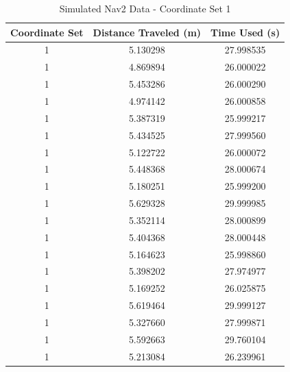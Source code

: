 \documentclass[%
paper=A4,               %
twoside=true,           %
openright,              %
11pt,                   %
bibliography=totoc,     %
titlepage=on,           %
DIV=12,                 %
BCOR=1.5cm,             %
parskip=half,            %
final
]{scrreprt}
\begin{document}
	\begin{table}[h!]
		\centering
		\begin{tabular}{|c|c|c|}
			\hline
			Coordinate Set & Distance Traveled (m)& Time Used (s) \\
			\hline
			1 & 5.130298 & 27.998535 \\
			1 & 4.869894 & 26.000022 \\
			1 & 5.453286 & 26.000290 \\
			1 & 4.974142 & 26.000858 \\
			1 & 5.387319 & 25.999217 \\
			1 & 5.434525 & 27.999560 \\
			1 & 5.122722 & 26.000072 \\
			1 & 5.448368 & 28.000674 \\
			1 & 5.180251 & 25.999200 \\
			1 & 5.629328 & 29.999985 \\
			1 & 5.352114 & 28.000899 \\
			1 & 5.404368 & 28.000448 \\
			1 & 5.164623 & 25.998860 \\
			1 & 5.398202 & 27.974977 \\
			1 & 5.169252 & 26.025875 \\
			1 & 5.619464 & 29.999127 \\
			1 & 5.327660 & 27.999871 \\
			1 & 5.592663 & 29.760104 \\
			1 & 5.213084 & 26.239961 \\
			\hline
		\end{tabular}
		\caption{Simulated Nav2 Data - Coordinate Set 1}
		\label{tab:2}
	\end{table}
	
\end{document}

